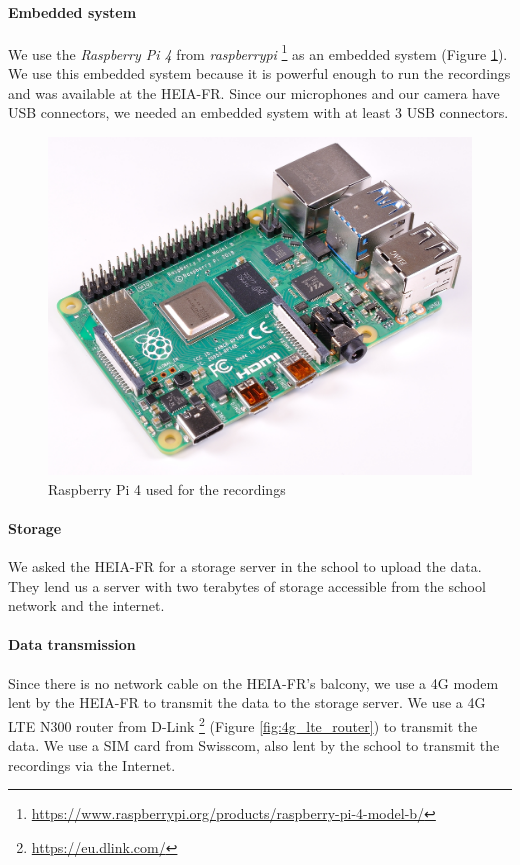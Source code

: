 \paragraph{Embedded system}
We use the \textit{Raspberry Pi 4} from \textit{raspberrypi} \footnote{\url{https://www.raspberrypi.org/products/raspberry-pi-4-model-b/}} as an embedded system (Figure \ref{fig:raspberry_pi_4}). We use this embedded system because it is powerful enough to run the recordings and was available at the HEIA-FR. Since our microphones and our camera have USB connectors, we needed an embedded system with at least 3 USB connectors.

\begin{figure}[H]
    \centering
    \includegraphics[width=.5\textwidth]{images/raspberry_pi_4.png}
    \caption{Raspberry Pi 4 used for the recordings}
    \label{fig:raspberry_pi_4}
\end{figure}

\paragraph{Storage}

We asked the HEIA-FR for a storage server in the school to upload the data. They lend us a server with two terabytes of storage accessible from the school network and the internet.

\paragraph{Data transmission}

Since there is no network cable on the HEIA-FR's balcony, we use a 4G modem lent by the HEIA-FR to transmit the data to the storage server. We use a 4G LTE N300 router from D-Link \footnote{\url{https://eu.dlink.com/}} (Figure \ref{fig:4g_lte_router}) to transmit the data. We use a SIM card from Swisscom, also lent by the school to transmit the recordings via the Internet.

